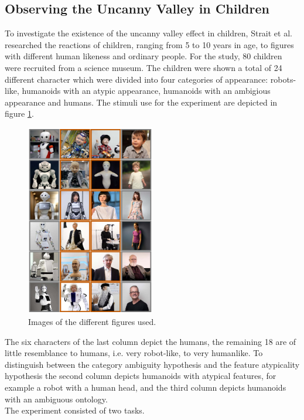 \subsection{Observing the Uncanny Valley in Children}
To investigate the existence of the uncanny valley effect in children, Strait et al. \cite{childrens_responding} researched the reactions of children, ranging from 5 to 10 years in age, to figures with different human likeness and ordinary people. For the study, 80 children were recruited from a science museum. The children were shown a total of 24 different character which were divided into four categories of appearance: robots-like, humanoids with an atypic appearance, humanoids with an ambigious appearance and humans. The stimuli use for the experiment are depicted in figure \ref{fig:childrensRespondingAvatars}.
\begin{figure} %
    \centering
    \includegraphics[width=0.5\textwidth]{graphics/childrens_responding_avatars.png}
    \caption{Images of the different figures used.}
    \label{fig:childrensRespondingAvatars}
\end{figure}
The six characters of the last column depict the humans, the remaining 18 are of little resemblance to humans, i.e. very robot-like, to very humanlike. To distinguish between the category ambiguity hypothesis and the feature atypicality hypothesis the second column depicts humanoids with atypical features, for example a robot with a human head, and the third column depicts humanoids with an ambiguous ontology.\\
The experiment consisted of two tasks.
